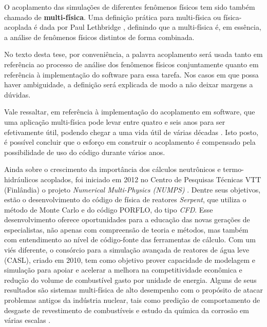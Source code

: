 O acoplamento das simulações de diferentes fenômenos físicos tem sido também chamado de
\textbf{multi-física}. 
Uma definição prática para multi-física ou física-acoplada é dada por Paul Lethbridge \cite{Lethbridge2005}, definindo que 
a multi-física é, em essência, a análise de fenômenos físicos distintos de forma combinada.

No texto desta tese, 
por conveniência, a palavra acoplamento será usada tanto em referência ao processo de análise dos fenômenos físicos conjuntamente 
quanto em referência à implementação do software para essa tarefa. Nos casos em que possa haver ambiguidade, 
a definição será explicada de modo a não deixar margens a dúvidas.

Vale ressaltar, em referência à implementação do acoplamento em software, que uma aplicação multi-física 
pode levar entre quatro e seis anos para ser efetivamente útil, podendo chegar a uma vida útil de várias décadas 
\cite{Graham2004}. Isto posto, é possível concluir que o esforço em construir o acoplamento é compensado 
pela possibilidade de uso do código durante vários anos.

Ainda sobre o crescimento da importância dos cálculos neutrônicos e termo-hidráulicos acoplados, foi iniciado em 2012
no Centro de Pesquisas Técnicas VTT (Finlândia) o projeto \textit{Numerical Multi-Physics (NUMPS)} \cite{Leppanen2015}.
Dentre seus objetivos, estão o desenvolvimento do código de física de reatores \textit{Serpent}, que utiliza o método de
Monte Carlo e do código PORFLO, do tipo \textit{CFD}. Esse desenvolvimento oferece oportunidades para a educação das novas
gerações de especialistas, não apenas com compreensão de teoria e métodos, mas também com entendimento ao nível de
código-fonte das ferramentas de cálculo. Com um viés diferente, o consórcio para a simulação avançada de reatores
de água leve (CASL), criado em 2010, tem como objetivo prover capacidade de modelagem e simulação para apoiar e acelerar
a melhora na competitividade econômica e redução do volume de combustível gasto por unidade de energia. Alguns de seus
resultados são sistemas multi-física de alto desempenho com o propósito de atacar problemas antigos da indústria nuclear,
tais como predição de comportamento de desgaste de revestimento de combustíveis e estudo da química da corrosão em várias
escalas \cite{Turinsky2016}.


